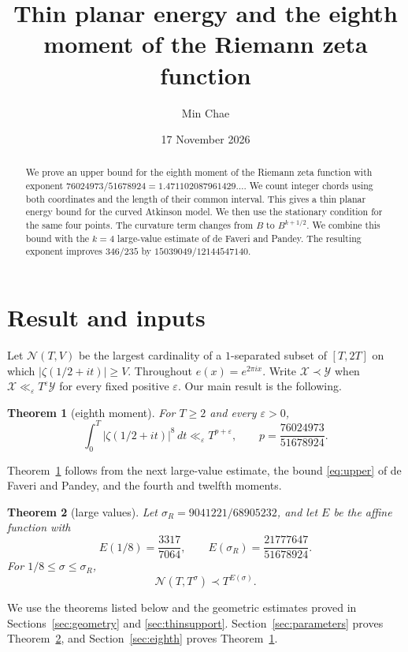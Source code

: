 \documentclass[11pt]{amsart}
\title[Thin planar energy and the eighth moment]{Thin planar energy and the eighth moment of the Riemann zeta function}
\author{Min Chae}
\date{17 November 2026}
\numberwithin{equation}{section}
\newtheorem{theorem}{Theorem}[section]
\newcommand{\cN}{\mathcal N}
\begin{document}
\raggedbottom
\begin{abstract}
We prove an upper bound for the eighth moment of the Riemann zeta
function with exponent $76024973/51678924=1.471102087961429\ldots$.
We count integer chords using both coordinates and the length of their
common interval. This gives a thin planar energy bound for the curved
Atkinson model. We then use the stationary condition for the same four
points. The curvature term changes from $B$ to $B^{k+1/2}$.
We combine this bound with the $k=4$ large-value estimate of de Faveri
and Pandey. The resulting exponent improves $346/235$ by
$15039049/12144547140$.
\end{abstract}
\maketitle

\section{Result and inputs}
Let $\cN(T,V)$ be the largest cardinality of a $1$-separated subset of
$[T,2T]$ on which $|\zeta(1/2+it)|\ge V$. Throughout $e(x)=e^{2\pi ix}$.
Write $\mathcal X\prec\mathcal Y$ when
$\mathcal X\ll_\varepsilon T^\varepsilon\mathcal Y$ for every fixed
positive $\varepsilon$.
Our main result is the following.
\begin{theorem}[eighth moment]\label{thm:eighth}
For $T\ge2$ and every $\varepsilon>0$,
\begin{equation}\label{eq:moments}
\int_0^T|\zeta(1/2+it)|^8\,dt
 \ll_\varepsilon T^{p+\varepsilon},\qquad
 p=\frac{76024973}{51678924}.
\end{equation}
\end{theorem}
Theorem~\ref{thm:eighth} follows from the next large-value estimate,
the bound \eqref{eq:upper} of de Faveri and Pandey, and the fourth and
twelfth moments.
\begin{theorem}[large values]\label{thm:largeeighth}
Let $\sigma_R=9041221/68905232$, and let $E$ be the affine function with
\[
 E(1/8)=\frac{3317}{7064},\qquad
 E(\sigma_R)=\frac{21777647}{51678924}.
\]
For $1/8\le\sigma\le\sigma_R$,
\[
 \cN(T,T^\sigma)\prec T^{E(\sigma)}.
\]
\end{theorem}
We use the theorems listed below and the geometric estimates proved
in Sections~\ref{sec:geometry} and \ref{sec:thinsupport}.
Section~\ref{sec:parameters} proves Theorem~\ref{thm:largeeighth}, and
Section~\ref{sec:eighth} proves Theorem~\ref{thm:eighth}.
\end{document}
